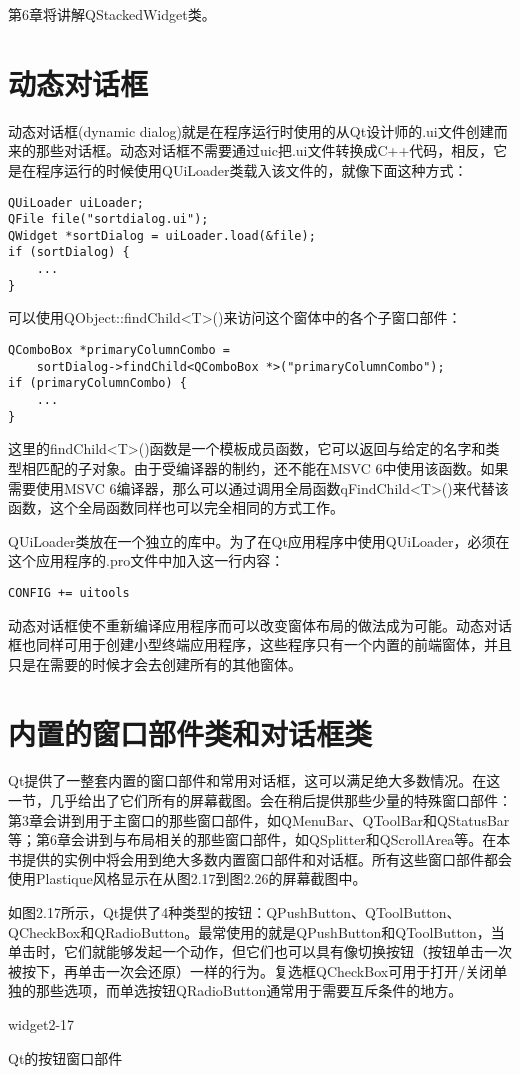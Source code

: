 \documentclass[11pt,oneside]{book}
\begin{document}
\begin{common-format}
第6章将讲解QStackedWidget类。

\section{动态对话框}
动态对话框(dynamic dialog)就是在程序运行时使用的从Qt设计师的.ui文件创建而来的那些对话框。动态对话框不需要通过uic把.ui文件转换成C++代码，相反，它是在程序运行的时候使用QUiLoader类载入该文件的，就像下面这种方式：
\begin{Verbatim}
QUiLoader uiLoader;
QFile file("sortdialog.ui");
QWidget *sortDialog = uiLoader.load(&file);
if (sortDialog) {
    ...
}
\end{Verbatim}

可以使用QObject::findChild<T>()来访问这个窗体中的各个子窗口部件：
\begin{Verbatim}
QComboBox *primaryColumnCombo =
    sortDialog->findChild<QComboBox *>("primaryColumnCombo");
if (primaryColumnCombo) {
    ...
}
\end{Verbatim}

这里的findChild<T>()函数是一个模板成员函数，它可以返回与给定的名字和类型相匹配的子对象。由于受编译器的制约，还不能在MSVC 6中使用该函数。如果需要使用MSVC 6编译器，那么可以通过调用全局函数qFindChild<T>()来代替该函数，这个全局函数同样也可以完全相同的方式工作。

QUiLoader类放在一个独立的库中。为了在Qt应用程序中使用QUiLoader，必须在这个应用程序的.pro文件中加入这一行内容：
\begin{Verbatim}
CONFIG += uitools
\end{Verbatim}

动态对话框使不重新编译应用程序而可以改变窗体布局的做法成为可能。动态对话框也同样可用于创建小型终端应用程序，这些程序只有一个内置的前端窗体，并且只是在需要的时候才会去创建所有的其他窗体。


\section{内置的窗口部件类和对话框类}
Qt提供了一整套内置的窗口部件和常用对话框，这可以满足绝大多数情况。在这一节，几乎给出了它们所有的屏幕截图。会在稍后提供那些少量的特殊窗口部件：第3章会讲到用于主窗口的那些窗口部件，如QMenuBar、QToolBar和QStatusBar等；第6章会讲到与布局相关的那些窗口部件，如QSplitter和QScrollArea等。在本书提供的实例中将会用到绝大多数内置窗口部件和对话框。所有这些窗口部件都会使用Plastique风格显示在从图2.17到图2.26的屏幕截图中。

如图2.17所示，Qt提供了4种类型的按钮：QPushButton、QToolButton、QCheckBox和QRadioButton。最常使用的就是QPushButton和QToolButton，当单击时，它们就能够发起一个动作，但它们也可以具有像切换按钮（按钮单击一次被按下，再单击一次会还原）一样的行为。复选框QCheckBox可用于打开/关闭单独的那些选项，而单选按钮QRadioButton通常用于需要互斥条件的地方。
\begin{linefig}[0.8]{widget2-17}
\caption{Qt的按钮窗口部件}
\label{fig:widget2-17}
\end{linefig}


\end{common-format}
\end{document}
